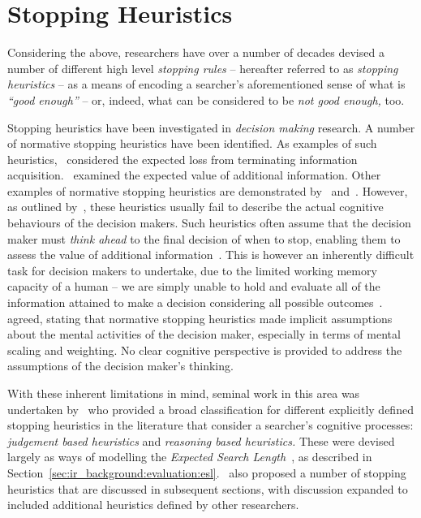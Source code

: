 \section{Stopping Heuristics}\label{sec:stopping_background:heuristics}
Considering the above, researchers have over a number of decades devised a number of different high level \emph{stopping rules} -- hereafter referred to as \emph{stopping heuristics} -- as a means of encoding a searcher's aforementioned sense of what is \emph{``good enough''} -- or, indeed, what can be considered to be \emph{not good enough,} too.

Stopping heuristics have been investigated in \emph{decision making} research. A number of normative stopping heuristics have been identified. As examples of such heuristics,~\cite{busemeyer1988deferred_decision_making} considered the expected loss from terminating information acquisition.~\cite{kogut1990sunk_costs} examined the expected value of additional information. Other examples of normative stopping heuristics are demonstrated by~\cite{pitz1969information_seeking} and~\cite{busemeyer1988deferred_decision_making}. However, as outlined by~\cite{browne2004stopping_rules}, these heuristics usually fail to describe the actual cognitive behaviours of the decision makers. Such heuristics often assume that the decision maker must \emph{think ahead} to the final decision of when to stop, enabling them to assess the value of additional information~\citep{busemeyer1988deferred_decision_making}. This is however an inherently difficult task for decision makers to undertake, due to the limited working memory capacity of a human -- we are simply unable to hold and evaluate all of the information attained to make a decision considering all possible outcomes~\citep{browne2004stopping_rules}.~\cite{nickles1995judgment} agreed, stating that normative stopping heuristics made implicit assumptions about the mental activities of the decision maker, especially in terms of mental scaling and weighting. No clear cognitive perspective is provided to address the assumptions of the decision maker's thinking.

With these inherent limitations in mind, seminal work in this area was undertaken by~\cite{nickles1995judgment} who provided a broad classification for different explicitly defined stopping heuristics in the literature that consider a searcher's cognitive processes: \emph{judgement based heuristics} and \emph{reasoning based heuristics.} These were devised largely as ways of modelling the \emph{Expected Search Length}~\citep{cooper1968expected_search_length}, as described in Section~\ref{sec:ir_background:evaluation:esl}.~\cite{nickles1995judgment} also proposed a number of stopping heuristics that are discussed in subsequent sections, with discussion expanded to included additional heuristics defined by other researchers.

